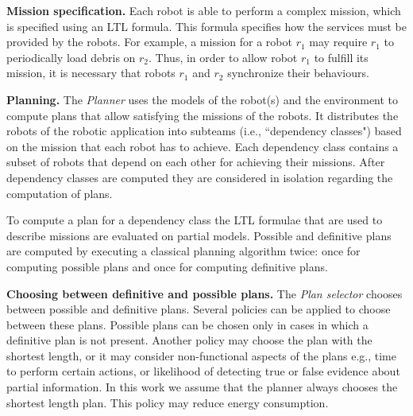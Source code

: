 \textbf{Mission specification.}
Each robot is able to perform a complex mission, which is specified using an LTL formula.
This formula specifies how the services must be provided by the robots.
For example, a mission for a robot $r_1$ may require $r_1$ to  periodically load debris on $r_2$.
Thus, in order to allow robot $r_1$ to fulfill its mission, it is necessary that robots $r_1$ and $r_2$ synchronize their behaviours.





\textbf{Planning.} 
The \emph{Planner} uses the models of the robot(s) and the environment to compute plans that allow satisfying the missions of the robots.
It distributes the robots of the robotic application into subteams (i.e., ``dependency classes") based on the mission that each robot has to achieve.
Each dependency class contains a subset of robots that depend on each other for achieving their missions.
After  dependency classes are computed they are considered in isolation regarding the computation of plans. %

To compute a plan for a dependency class the  LTL formulae that are used to describe missions are evaluated on partial models.
Possible and definitive plans are computed by executing a classical planning algorithm twice: once for computing possible plans and once for computing definitive plans.



\textbf{Choosing between definitive and possible plans.}
The \emph{Plan selector} chooses between possible and definitive plans.
Several policies can be applied to choose between these plans.
Possible plans can be chosen only in cases in which a definitive plan is  not present.
Another policy may choose the plan with the shortest length, or it may consider non-functional aspects of the plans e.g., time to perform certain actions, or likelihood of detecting true or false evidence about partial information. 
In this work we assume  that the planner always chooses the shortest length plan. %
This policy may  reduce energy consumption. %

